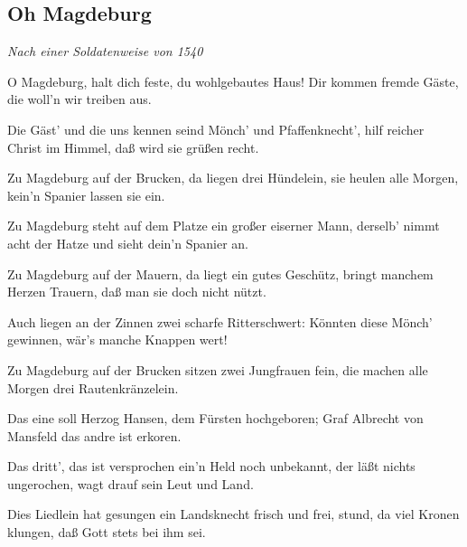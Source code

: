 \documentclass[a5paper,pagesize,twoside,10pt,headings=small]{scrreprt}
\newcommand\songheader[3][]{%
  \clearpage%
    \subsection*{\centering #2}\vspace{0.5\baselineskip}%
    \addcontentsline{toc}{subsection}{#2}
    \centering \textit{#3}\\%
    \vspace{\baselineskip}\par%
}
\begin{document}
\songheader{Oh Magdeburg}{Nach einer Soldatenweise von 1540}%
\begin{multicols*}{2}
\begin{guitar}
O Magdeburg, halt dich feste,
du wohlgebautes Haus!
Dir kommen fremde Gäste,
die woll'n wir treiben aus.

Die Gäst' und die uns kennen seind
Mönch' und Pfaffenknecht',
hilf reicher Christ im Himmel,
daß wird sie grüßen recht.

Zu Magdeburg auf der Brucken,
da liegen drei Hündelein,
sie heulen alle Morgen,
kein'n Spanier lassen sie ein.

Zu Magdeburg steht auf dem Platze
ein großer eiserner Mann,
derselb' nimmt acht der Hatze
und sieht dein'n Spanier an.

Zu Magdeburg auf der Mauern,
da liegt ein gutes Geschütz,
bringt manchem Herzen Trauern,
daß man sie doch nicht nützt.

\columnbreak

Auch liegen an der Zinnen
zwei scharfe Ritterschwert:
Könnten diese Mönch' gewinnen,
wär's manche Knappen wert!

Zu Magdeburg auf der Brucken
sitzen zwei Jungfrauen fein,
die machen alle Morgen
drei Rautenkränzelein.

Das eine soll Herzog Hansen,
dem Fürsten hochgeboren;
Graf Albrecht von Mansfeld
das andre ist erkoren.

Das dritt', das ist versprochen
ein'n Held noch unbekannt,
der läßt nichts ungerochen,
wagt drauf sein Leut und Land.

Dies Liedlein hat gesungen
ein Landsknecht frisch und frei,
stund, da viel Kronen klungen,
daß Gott stets bei ihm sei.
\end{guitar}
\end{multicols*}
\end{document}

